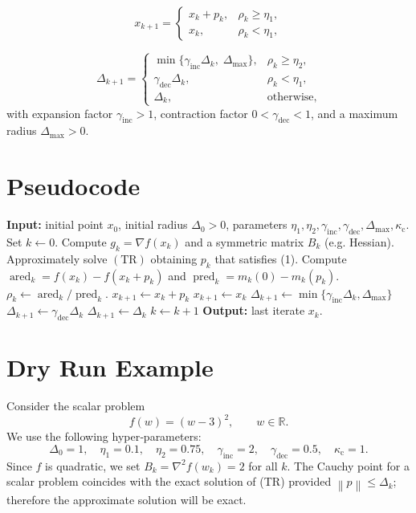 \documentclass{article}
\newcommand{\norm}[1]{\left\lVert#1\right\rVert}
\newcommand{\R}{\mathbb{R}}
\begin{document}
\[
x_{k+1}= 
\begin{cases}
x_k+p_k, & \rho_k\ge \eta_1,\\[2mm]
x_k, & \rho_k<\eta_1,
\end{cases}
\tag{3}
\]

\[
\Delta_{k+1}= 
\begin{cases}
\displaystyle \min\{\gamma_{\mathrm{inc}}\Delta_k,\;\Delta_{\max}\},
& \rho_k\ge \eta_2,\\[2mm]
\displaystyle \gamma_{\mathrm{dec}}\Delta_k,
& \rho_k<\eta_1,\\[2mm]
\Delta_k, & \text{otherwise},
\end{cases}
\tag{4}
\]
with expansion factor \(\gamma_{\mathrm{inc}}>1\), contraction factor
\(0<\gamma_{\mathrm{dec}}<1\), and a maximum radius \(\Delta_{\max}>0\).

\section*{Pseudocode}
\begin{algorithm}[H]
\caption{Trust‑Region Method with Approximate Subproblem Solution (TR‑AS)}
\begin{algorithmic}[1]
\State \textbf{Input:} initial point \(x_0\), initial radius \(\Delta_0>0\),
parameters \(\eta_1,\eta_2,\gamma_{\mathrm{inc}},\gamma_{\mathrm{dec}},\Delta_{\max},\kappa_{\mathrm{c}}\).
\State Set \(k\gets0\).
    \State Compute \(g_k=\nabla f(x_k)\) and a symmetric matrix \(B_k\) (e.g. Hessian).
    \State Approximately solve \((\text{TR})\) obtaining \(p_k\) that satisfies (1).
    \State Compute \(\operatorname{ared}_k = f(x_k)-f(x_k+p_k)\) and
          \(\operatorname{pred}_k = m_k(0)-m_k(p_k)\).
    \State \(\rho_k \gets \operatorname{ared}_k/\operatorname{pred}_k\).
        \State \(x_{k+1}\gets x_k+p_k\) 
    \Else
        \State \(x_{k+1}\gets x_k\) 
    \EndIf
        \State \(\Delta_{k+1}\gets \min\{\gamma_{\mathrm{inc}}\Delta_k,\Delta_{\max}\}\)
        \State \(\Delta_{k+1}\gets \gamma_{\mathrm{dec}}\Delta_k\)
    \Else
        \State \(\Delta_{k+1}\gets \Delta_k\)
    \EndIf
    \State \(k\gets k+1\)
\EndWhile
\State \textbf{Output:} last iterate \(x_k\).
\end{algorithmic}
\end{algorithm}

\section*{Dry Run Example}
Consider the scalar problem
\[
f(w)=(w-3)^2,\qquad w\in\R.
\]
We use the following hyper‑parameters:
\[
\Delta_0=1,\quad \eta_1=0.1,\quad \eta_2=0.75,\quad
\gamma_{\mathrm{inc}}=2,\quad \gamma_{\mathrm{dec}}=0.5,\quad
\kappa_{\mathrm{c}}=1.
\]
Since \(f\) is quadratic, we set \(B_k = \nabla^2 f(w_k)=2\) for all \(k\).
The Cauchy point for a scalar problem coincides with the exact solution of (TR)
provided \(\norm{p}\le\Delta_k\); therefore the approximate solution will be exact.
\end{document}
